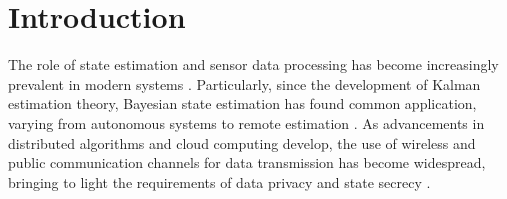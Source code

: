 \documentclass[letterpaper, 10 pt, conference]{ieeeconf}
\begin{document}
\section{Introduction}
The role of state estimation and sensor data processing has become increasingly prevalent in modern systems \cite{ligginsDistributedDataFusion2012}. Particularly, since the development of Kalman estimation theory, Bayesian state estimation has found common application, varying from autonomous systems to remote estimation \cite{mutambaraDecentralizedEstimationControl1998,sinopoliKalmanFilteringIntermittent2004}. As advancements in distributed algorithms and cloud computing develop, the use of wireless and public communication channels for data transmission has become widespread, bringing to light the requirements of data privacy and state secrecy \cite{renSecurityChallengesPublic2012,brennerSecretProgramExecution2011}.
\end{document}
